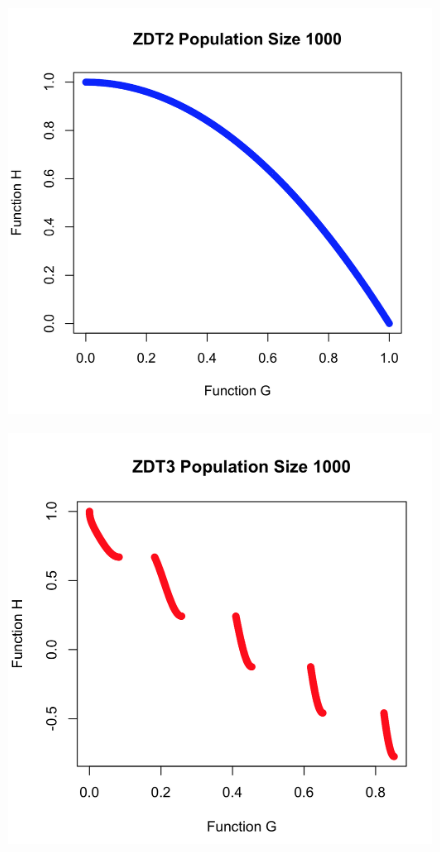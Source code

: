 \documentclass[a4paper,12pt]{article}
\begin{document}
\begin{figure}[h]
\centering
\begin{minipage}{.5\textwidth}
  \centering
  \includegraphics[width=.8\linewidth]{q1graphs/zdt2_1000.png}
  \label{fig:zdt21000}
\end{minipage}%
\begin{minipage}{.5\textwidth}
  \centering
  \includegraphics[width=.8\linewidth]{q1graphs/zdt3_1000.png}
  \label{fig:zdt31000}
\end{minipage}
\end{figure}
\paragraph{}
\end{document}
